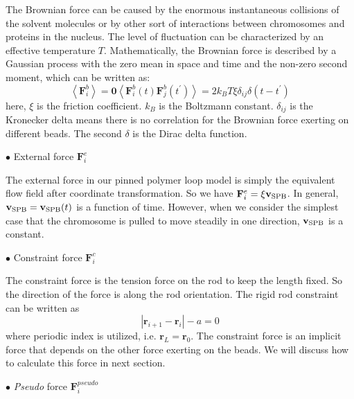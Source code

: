 The Brownian force can be caused by the enormous instantaneous collisions of the solvent molecules or by other sort of interactions between chromosomes and proteins in the nucleus. The level of fluctuation can be characterized by an effective temperature $T$. Mathematically, the Brownian force is described by a Gaussian process with the zero mean in space and time and the non-zero second moment, which can be written as:
\begin{subequations}
    \label{eq:brownianforce}
    \begin{equation}
        \left<\mathbf{F}_i^b\right> =\mathbf{0} 
    \end{equation}
    \begin{equation}
        \left<\mathbf{F}_i^b(t)\mathbf{F}_j^b(t^{\prime})\right> = 2k_B T \xi \delta_{ij} \delta(t-t^{\prime})
    \end{equation}
\end{subequations}
here, $\xi$ is the friction coefficient. $k_B$ is the Boltzmann constant. $\delta_{ij}$ is the Kronecker delta means there is no correlation for the Brownian force exerting on different beads. The second $\delta$ is the Dirac delta function. 

$\bullet$ External force $\mathbf{F}_i^{e}$

The external force in our pinned polymer loop model is simply the equivalent flow field after coordinate transformation. So we have $\mathbf{F}_i^e = \xi \mathbf{v}_{\rm{SPB}}$. In general, $\mathbf{v}_{\rm{SPB}} = \mathbf{v}_{\rm{SPB}}(t)$ is a function of time. However, when we consider the simplest case that the chromosome is pulled to move steadily in one direction, $\mathbf{v}_{\rm{SPB}}$ is a constant.

$\bullet$ Constraint force $\mathbf{F}_i^{c}$

The constraint force is the tension force on the rod to keep the length fixed. So the direction of the force is along the rod orientation. The rigid rod constraint can be written as 
\begin{equation}
    \label{eq:rodConstraint}
    |\mathbf{r}_{i+1} - \mathbf{r}_i| - a = 0
\end{equation}
where periodic index is utilized, i.e. $\mathbf{r}_{L} = \mathbf{r}_0$. The constraint force is an implicit force that depends on the other force exerting on the beads. We will discuss how to calculate this force in next section. 

$\bullet$ \emph{Pseudo} force $\mathbf{F}_i^{pseudo}$

